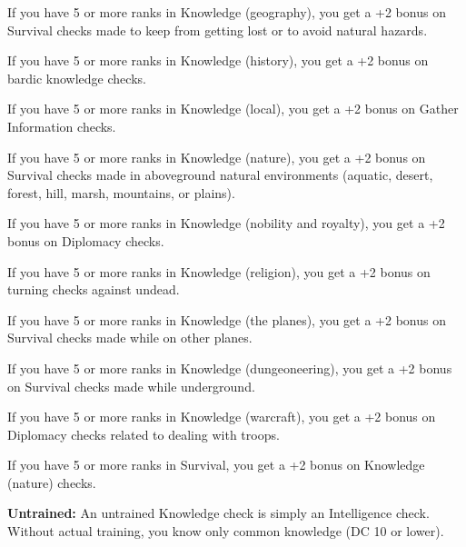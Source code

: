 If you have 5 or more ranks in Knowledge (geography), you get a +2 bonus on Survival checks made to keep from getting lost or to avoid natural hazards.

If you have 5 or more ranks in Knowledge (history), you get a +2 bonus on bardic knowledge checks.

If you have 5 or more ranks in Knowledge (local), you get a +2 bonus on Gather Information checks.

If you have 5 or more ranks in Knowledge (nature), you get a +2 bonus on Survival checks made in aboveground natural environments (aquatic, desert, forest, hill, marsh, mountains, or plains).

If you have 5 or more ranks in Knowledge (nobility and royalty), you get a +2 bonus on Diplomacy checks.

If you have 5 or more ranks in Knowledge (religion), you get a +2 bonus on turning checks against undead.

If you have 5 or more ranks in Knowledge (the planes), you get a +2 bonus on Survival checks made while on other planes.

If you have 5 or more ranks in Knowledge (dungeoneering), you get a +2 bonus on Survival checks made while underground.

If you have 5 or more ranks in Knowledge (warcraft), you get a +2 bonus on Diplomacy checks related to dealing with troops.

If you have 5 or more ranks in Survival, you get a +2 bonus on Knowledge (nature) checks.

\textbf{Untrained:} An untrained Knowledge check is simply an Intelligence check. Without actual training, you know only common knowledge (DC 10 or lower).


